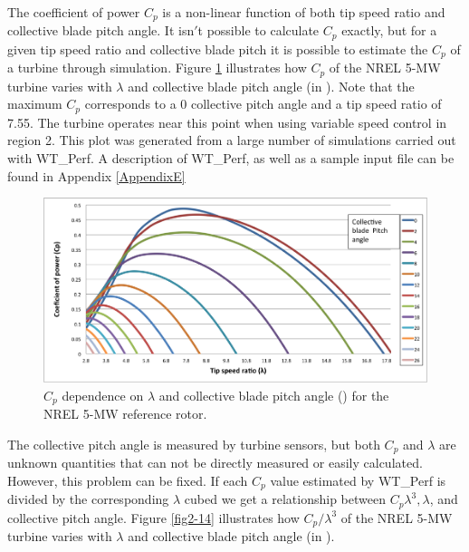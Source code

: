 The coefficient of power $C_p$ is a non-linear function of both tip speed ratio and collective blade pitch angle. It isn$'$t possible to calculate $C_p$ exactly, but for a given tip speed ratio and collective blade pitch it is possible to estimate the $C_p$ of a turbine through simulation.  Figure \ref{fig2-13} illustrates how $C_p$ of the NREL 5-MW turbine varies with $\lambda$ and collective blade pitch angle (in \degree). Note that the maximum $C_p$ corresponds to a 0\degree{} collective pitch angle and a tip speed ratio of 7.55. The turbine operates near this point when using variable speed control in region 2. This plot was generated from a large number of simulations carried out with WT\_Perf.\cite{platt2012} A description of WT\_Perf, as well as a sample input file can be found in Appendix \ref{AppendixE}

\begin{figure}[ht]
	\centering
		\includegraphics[width=\textwidth]{Figures/ch2Figures/fig2-13.png}
		
	\caption{$C_p$ dependence on $\lambda$ and collective blade pitch angle (\degree) for the NREL 5-MW reference rotor.}
	\label{fig2-13}
\end{figure}

The collective pitch angle is measured by turbine sensors, but both $C_p$ and $\lambda$ are unknown quantities that can not be directly measured or easily calculated. However, this problem can be fixed. If each $C_p$ value estimated by WT\_Perf is divided by the corresponding $\lambda$ cubed we get a relationship between $C_p\lambda^3, \lambda$, and collective pitch angle. Figure \ref{fig2-14}  illustrates how $C_p / \lambda^3$ of the NREL 5-MW turbine varies with $\lambda$ and collective blade pitch angle (in \degree). 

